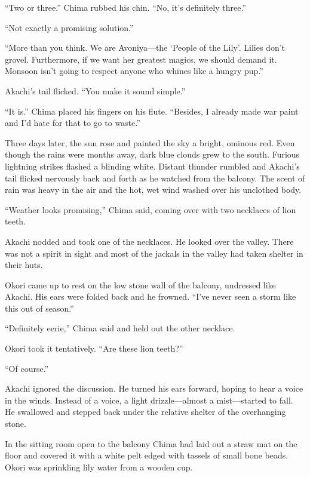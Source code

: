 ``Two or three.'' Chima rubbed his chin. ``No, it's definitely three.''

``Not exactly a promising solution.''

``More than you think. We are Avoniya---the `People of the Lily'. Lilies don't grovel. Furthermore, if we want her greatest magics, we should demand it. Monsoon isn't going to respect anyone who whines like a hungry pup.''

Akachi's tail flicked. ``You make it sound simple.''

``It is.'' Chima placed his fingers on his flute. ``Besides, I already made war paint and I'd hate for that to go to waste.''

\vspace{-0.5em}

\secdiv

\vspace{-0.5em}


\noindent Three days later, the sun rose and painted the sky a bright, ominous red. Even though the rains were months away, dark blue clouds grew to the south. Furious lightning strikes flashed a blinding white. Distant thunder rumbled and Akachi's tail flicked nervously back and forth as he watched from the balcony. The scent of rain was heavy in the air and the hot, wet wind washed over his unclothed body.

``Weather looks promising,'' Chima said, coming over with two necklaces of lion teeth.

Akachi nodded and took one of the necklaces. He looked over the valley. There was not a spirit in sight and most of the jackals in the valley had taken shelter in their huts.

Okori came up to rest on the low stone wall of the balcony, undressed like Akachi. His ears were folded back and he frowned. ``I've never seen a storm like this out of season.''

``Definitely eerie,'' Chima said and held out the other necklace.

Okori took it tentatively. ``Are these lion teeth?''

``Of course.''

Akachi ignored the discussion. He turned his ears forward, hoping to hear a voice in the winds. Instead of a voice, a light drizzle---almost a mist---started to fall. He swallowed and stepped back under the relative shelter of the overhanging stone.

In the sitting room open to the balcony Chima had laid out a straw mat on the floor and covered it with a white pelt edged with tassels of small bone beads. Okori was sprinkling lily water from a wooden cup.


